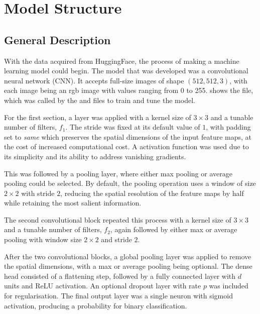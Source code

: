 
\newpage

\section{Model Structure}

\subsection{General Description}

With the data acquired from HuggingFace, the process of making a machine learning model could begin. The model that was developed was a convolutional neural network (CNN). It accepts full-size images of shape $(512, 512, 3)$, with each image being an rgb image with values ranging from 0 to 255.  shows the  file, which was called by the  and  files to train and tune the model.

\begin{figure}[h]
    
\end{figure}

For the first section, a  layer was applied with a kernel size of $3{\times}3$ and a tunable number of filters, $f_{1}$. The stride was fixed at its default value of $1$, with padding set to \emph{same} which preserves the spatial dimensions of the input feature maps, at the cost of increased computational cost. A  activation function was used due to its simplicity and its ability to address vanishing gradients.

This was followed by a pooling layer, where either max pooling or average pooling could be selected. By default, the pooling operation uses a window of size $2{\times}2$ with stride $2$, reducing the spatial resolution of the feature maps by half while retaining the most salient information.

The second convolutional block repeated this process with a kernel size of $3{\times}3$ and a tunable number of filters, $f_{2}$, again followed by either max or average pooling with window size $2{\times}2$ and stride $2$.

After the two convolutional blocks, a global pooling layer was applied to remove the spatial dimensions, with a max or average pooling being optional. The dense head consisted of a flattening step, followed by a fully connected layer with $d$ units and ReLU activation. An optional dropout layer with rate $p$ was included for regularisation. The final output layer was a single neuron with sigmoid activation, producing a probability for binary classification.

